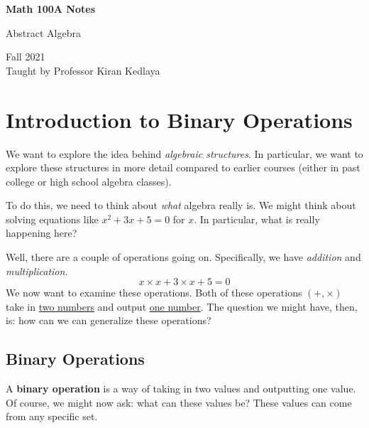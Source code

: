 \documentclass[letterpaper]{article}
\begin{document}
\begin{titlepage}
    \begin{center}
        \vspace*{1cm}
            
        \Huge
        \textbf{Math 100A Notes}
            
        \vspace{0.5cm}
        \LARGE
        Abstract Algebra
            
        \vspace{1.5cm}
            
        \vfill
            
        Fall 2021\\
        Taught by Professor Kiran Kedlaya
    \end{center}
\end{titlepage}


\newpage 

\begingroup
    \renewcommand\contentsname{Table of Contents}
    \tableofcontents
\endgroup

\newpage
{}

\section{Introduction to Binary Operations}
We want to explore the idea behind \emph{algebraic structures}. In particular, we want to explore these structures in more detail compared to earlier courses (either in past college or high school algebra classes). 


\bigskip 

To do this, we need to think about \emph{what} algebra really is. We might think about solving equations like $x^2 + 3x + 5 = 0$ for $x$. In particular, what is really happening here?

\bigskip 

Well, there are a couple of operations going on. Specifically, we have \emph{addition} and \emph{multiplication}. 
\[x \times x + 3 \times x + 5 = 0\]
We now want to examine these operations. Both of these operations $(+, \times)$ take in \underline{two numbers} and output \underline{one number}. The question we might have, then, is: how can we can generalize these operations?


\subsection{Binary Operations}
A \textbf{binary operation} is a way of taking in two values and outputting one value. Of course, we might now ask: what can these values be? These values can come from any specific set. 
\end{document}

